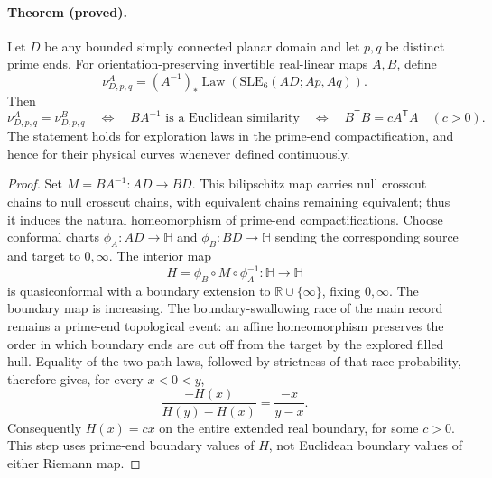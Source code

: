 \documentclass[11pt]{article}
\theoremstyle{definition}\newtheorem{definition}[theorem]{Definition}
\theoremstyle{remark}\newtheorem{remark}[theorem]{Remark}
\begin{document}
\paragraph{Theorem (proved).}
Let $D$ be any bounded simply connected planar domain and let $p,q$ be
distinct prime ends.  For orientation-preserving invertible real-linear
maps $A,B$, define
\[
 \nu^A_{D,p,q}
 =(A^{-1})_*\operatorname{Law}(\mathrm{SLE}_6(AD;Ap,Aq)).
\]
Then
\[
 \nu^A_{D,p,q}=\nu^B_{D,p,q}
 \quad\Longleftrightarrow\quad
 BA^{-1}\text{ is a Euclidean similarity}
 \quad\Longleftrightarrow\quad
 B^{\mathsf T}B=cA^{\mathsf T}A\quad(c>0).
 \tag{RA2}
\]
The statement holds for exploration laws in the prime-end compactification,
and hence for their physical curves whenever defined continuously.

\begin{proof}
Set $M=BA^{-1}:AD\to BD$.  This bilipschitz map carries null crosscut
chains to null crosscut chains, with equivalent chains remaining equivalent;
thus it induces the natural homeomorphism of prime-end compactifications.
Choose conformal charts $\phi_A:AD\to\mathbb H$ and
$\phi_B:BD\to\mathbb H$ sending the corresponding source and target to
$0,\infty$.  The interior map
\[
 H=\phi_B\circ M\circ\phi_A^{-1}:\mathbb H\to\mathbb H
\]
is quasiconformal with a boundary extension to $\mathbb R\cup\{\infty\}$,
fixing $0,\infty$.  The boundary map is increasing.  The boundary-swallowing
race of the main record remains a prime-end topological event: an affine
homeomorphism preserves the order in which boundary ends are cut off from
the target by the explored filled hull.  Equality of the two path laws,
followed by strictness of that race probability, therefore gives, for every
$x<0<y$,
\[
 \frac{-H(x)}{H(y)-H(x)}=\frac{-x}{y-x}.
\]
Consequently $H(x)=cx$ on the entire extended real boundary, for some $c>0$.
This step uses prime-end boundary values of $H$, not Euclidean boundary
values of either Riemann map.


\end{proof}
\end{document}
